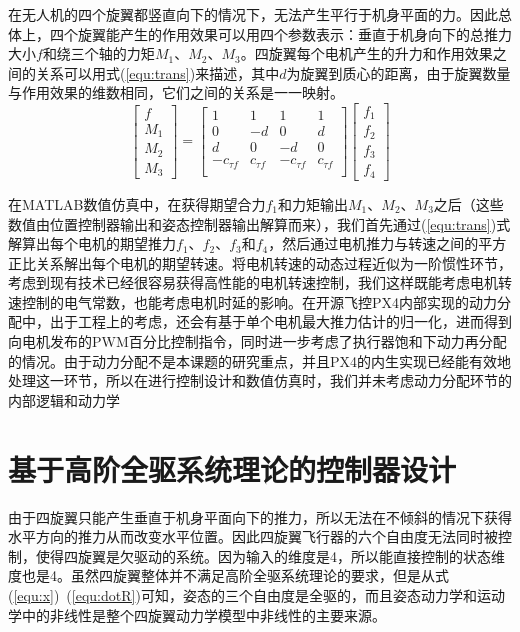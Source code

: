 在无人机的四个旋翼都竖直向下的情况下，无法产生平行于机身平面的力。因此总体上，四个旋翼能产生的作用效果可以用四个参数表示：垂直于机身向下的总推力大小$f$和绕三个轴的力矩$M_1$、$M_2$、$M_3$。四旋翼每个电机产生的升力和作用效果之间的关系可以用式(\ref{equ:trans})来描述，其中$d$为旋翼到质心的距离，由于旋翼数量与作用效果的维数相同，它们之间的关系是一一映射。
\begin{equation}
  \begin{bmatrix}
    f \\
    M_1 \\
     M_2\\M_3
    \end{bmatrix}=\begin{bmatrix}
    1 &1  & 1 & 1 \\
    0 & -d & 0 & d \\
    d & 0 & -d & 0 \\
    -c_{\tau f} & c_{\tau f} & -c_{\tau f} & c_{\tau f} \\
    \end{bmatrix}\begin{bmatrix}
     f_1\\
    f_2 \\
     f_3\\f_4
    \end{bmatrix}  
    \label{equ:trans}
\end{equation}

在MATLAB数值仿真中，在获得期望合力$f_1$和力矩输出$M_1$、$M_2$、$M_3$之后（这些数值由位置控制器输出和姿态控制器输出解算而来），我们首先通过(\ref{equ:trans})式解算出每个电机的期望推力$f_1$、$f_2$、$f_3$和$f_4$，然后通过电机推力与转速之间的平方正比关系解出每个电机的期望转速。将电机转速的动态过程近似为一阶惯性环节，考虑到现有技术已经很容易获得高性能的电机转速控制，我们这样既能考虑电机转速控制的电气常数，也能考虑电机时延的影响。在开源飞控PX4内部实现的动力分配中，出于工程上的考虑，还会有基于单个电机最大推力估计的归一化，进而得到向电机发布的PWM百分比控制指令，同时进一步考虑了执行器饱和下动力再分配的情况。由于动力分配不是本课题的研究重点，并且PX4的内生实现已经能有效地处理这一环节，所以在进行控制设计和数值仿真时，我们并未考虑动力分配环节的内部逻辑和动力学


\section{基于高阶全驱系统理论的控制器设计}

由于四旋翼只能产生垂直于机身平面向下的推力，所以无法在不倾斜的情况下获得水平方向的推力从而改变水平位置。因此四旋翼飞行器的六个自由度无法同时被控制，使得四旋翼是欠驱动的系统。因为输入的维度是4，所以能直接控制的状态维度也是4。虽然四旋翼整体并不满足高阶全驱系统理论的要求，但是从式(\ref{equ:x})~(\ref{equ:dotR})可知，姿态的三个自由度是全驱的，而且姿态动力学和运动学中的非线性是整个四旋翼动力学模型中非线性的主要来源。

